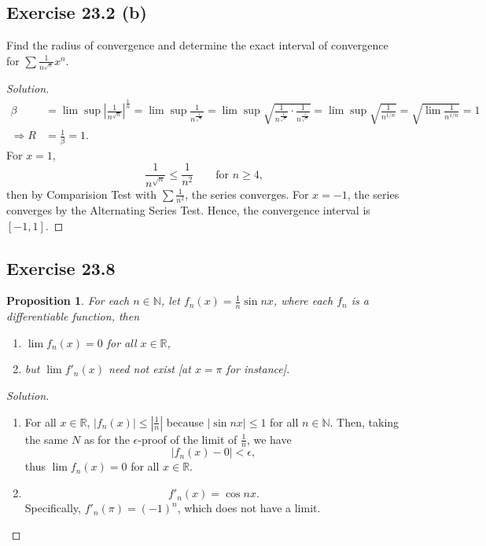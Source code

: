 \documentclass{article}
\newtheorem{proposition}[thm]{Proposition}
\renewcommand*{\implies}{\ensuremath{\Longrightarrow}}
\newcommand*{\R}{\ensuremath{\mathbb{R}}}
\newcommand*{\N}{\ensuremath{\mathbb{N}}}
\begin{document}
\subsection*{Exercise 23.2 (b)}
Find the radius of convergence and determine the exact interval of convergence for
$\sum \frac{1}{n^{\sqrt{n}}}x^n$.
\begin{proof}[Solution]
    \begin{align*}
        \beta & = \lim \sup \left|\frac{1}{n^{\sqrt{n}}}\right|^{\frac{1}{n}} =
        \lim \sup \frac{1}{n^{\frac{1}{\sqrt{n}}}} = 
        \lim \sup \sqrt{\frac{1}{n^{\frac{1}{\sqrt{n}}}}\cdot \frac{1}{n^{\frac{1}{\sqrt{n}}}}} = 
        \lim \sup \sqrt{\frac{1}{n^{1/n}}} = \sqrt{\lim \frac{1}{n^{1/n}}} = 1 \\
        \implies R & = \frac{1}{\beta} = 1.
    \end{align*}
    For $x=1$, $$\frac{1}{n^{\sqrt{n}}}\le \frac{1}{n^2}\qquad \text{for }n\ge 4,$$
    then by Comparision Test with $\sum \frac{1}{n^2}$, the series converges. For $x=-1$,
    the series converges by the Alternating Series Test. Hence, the convergence interval is
    $[-1, 1]$.
\end{proof}


\newpage
\subsection*{Exercise 23.8}
\begin{proposition}
    For each $n\in\N$, let $f_n(x)=\frac{1}{n}\sin nx$, where each $f_n$ is a differentiable function,
    then 
    \begin{enumerate}[label=\textbf{(\alph*)}]
        \item $\lim f_n(x)=0$ for all $x\in\R$,
        \item but $\lim f'_n(x)$ need not exist [at $x=\pi$ for instance].
    \end{enumerate}
\end{proposition}
\begin{proof}[Solution]\indent
    \begin{enumerate}[label=\textbf{(\alph*)}]
        \item For all $x\in \R$, $|f_n(x)|\le |\frac{1}{n}|$ because $|\sin nx|\le 1$ for all $n\in\N$.
        Then, taking the same $N$ as for the $\epsilon$-proof of the limit of $\frac{1}{n}$, we have 
        $$|f_n(x)-0|<\epsilon,$$ thus $\lim f_n(x)=0$ for all $x\in\R$.

        \item $$f'_n(x)=\cos nx.$$ Specifically, $f'_n(\pi)=(-1)^n$, which does not have a limit.
    \end{enumerate}
\end{proof}
\end{document}
